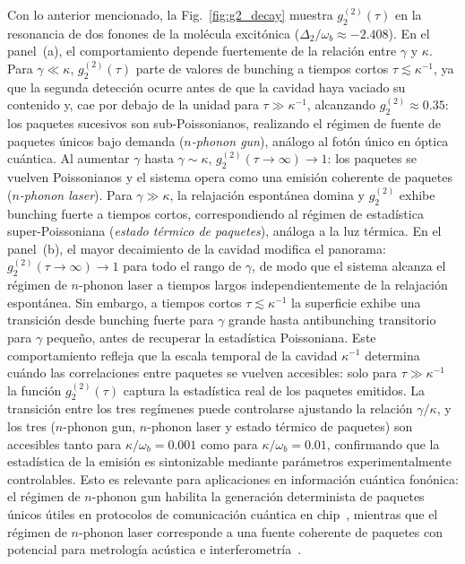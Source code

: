 Con lo anterior mencionado, la Fig.~\ref{fig:g2_decay} muestra $g_2^{(2)}(\tau)$ en la resonancia de dos fonones de la molécula excitónica ($\Delta_2/\omega_b \approx -2.408$). En el panel~(a), el comportamiento depende fuertemente de la relación entre $\gamma$ y $\kappa$. Para $\gamma \ll \kappa$, $g_2^{(2)}(\tau)$ parte de valores de bunching a tiempos cortos $\tau \lesssim \kappa^{-1}$, ya que la segunda detección ocurre antes de que la cavidad haya vaciado su contenido y, cae por debajo de la unidad para $\tau \gg \kappa^{-1}$, alcanzando $g_2^{(2)} \approx 0.35$: los paquetes sucesivos son sub-Poissonianos, realizando el régimen de fuente de paquetes únicos bajo demanda (\textit{$n$-phonon gun}), análogo al fotón único en óptica cuántica. Al aumentar $\gamma$ hasta $\gamma \sim \kappa$, $g_2^{(2)}(\tau\to\infty) \to 1$: los paquetes se vuelven Poissonianos y el sistema opera como una emisión coherente de paquetes (\textit{$n$-phonon laser}). Para $\gamma \gg \kappa$, la relajación espontánea domina y $g_2^{(2)}$ exhibe bunching fuerte a tiempos cortos, correspondiendo al régimen de estadística super-Poissoniana (\textit{estado térmico de paquetes}), análoga a la luz térmica. En el panel~(b), el mayor decaimiento de la cavidad modifica el panorama: $g_2^{(2)}(\tau\to\infty) \to 1$ para todo el rango de $\gamma$, de modo que el sistema alcanza el régimen de $n$-phonon laser a tiempos largos independientemente de la relajación espontánea. Sin embargo, a tiempos cortos $\tau \lesssim \kappa^{-1}$ la superficie exhibe una transición desde bunching fuerte para $\gamma$ grande hasta antibunching transitorio para $\gamma$ pequeño, antes de recuperar la estadística Poissoniana. Este comportamiento refleja que la escala temporal de la cavidad $\kappa^{-1}$ determina cuándo las correlaciones entre paquetes se vuelven accesibles: solo para $\tau \gg \kappa^{-1}$ la función $g_2^{(2)}(\tau)$ captura la estadística real de los paquetes emitidos. La transición entre los tres regímenes puede controlarse ajustando la relación $\gamma/\kappa$, y los tres ($n$-phonon gun, $n$-phonon laser y estado térmico de paquetes) son accesibles tanto para $\kappa/\omega_b = 0.001$ como para $\kappa/\omega_b = 0.01$, confirmando que la estadística de la emisión es sintonizable mediante parámetros experimentalmente controlables. Esto es relevante para aplicaciones en información cuántica fonónica: el régimen de $n$-phonon gun habilita la generación determinista de paquetes únicos útiles en protocolos de comunicación cuántica en chip~\cite{zivari2022}, mientras que el régimen de $n$-phonon laser corresponde a una fuente coherente de paquetes con potencial para metrología acústica e interferometría~\cite{navarro2015}. 

